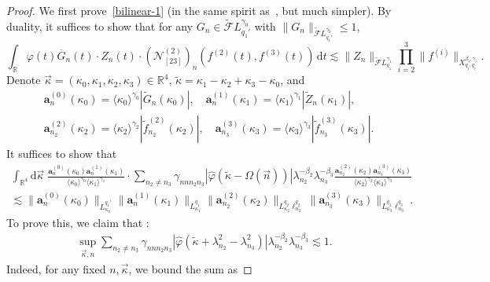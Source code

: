 \documentclass[11pt,reqno,english]{amsart}
\numberwithin{equation}{section}
\theoremstyle{plain}
\theoremstyle{definition}
\theoremstyle{remark}
\newcommand{\ov}{\overline}
\newcommand{\R}{\mathbb{R}}
\newcommand{\la}{\langle}
\newcommand{\ra}{\rangle}
\newcommand{\dd}{\mathrm{d}}
\begin{document}
\begin{proof}
	We first prove~\eqref{bilinear-1} (in the same spirit as~\cite{BCST24}, but much simpler).
	By duality, it suffices to show that for any $G_n\in \widetilde{\mathcal{F}}L_{q_1'}^{\gamma_0}$ with $\|G_n\|_{\widetilde{\mathcal{F}}L^{\gamma_0}_{q_1'}}\leq 1$,
	\begin{equation}\label{pf:bilinear-1}
		\int_{\R} \varphi(t)\ov{G}_n(t)\cdot Z_n(t)\cdot(\mathcal{N}_{[23]}^{(2)})_{n}(f^{(2)}(t),f^{(3)}(t))\, \dd t
		\lesssim
		\|Z_n\|_{\widetilde{\mathcal{F}}L_{q_1}^{\gamma_1}}
		\prod_{i=2}^{3}\|f^{(i)}\|_{X_{q_i,q_i}^{\beta_i,\gamma_i}}.
	\end{equation}
	Denote $\vec{\kappa}=(\kappa_0,\kappa_1,\kappa_2,\kappa_3)\in\R^4$, $\widetilde{\kappa}=\kappa_1-\kappa_2+\kappa_3-\kappa_0$, and
	\begin{align*}
		&\mathbf{a}_n^{(0)}(\kappa_0)=\la\kappa_0\ra^{\gamma_0}|\widetilde{G}_n(\kappa_0)|,\quad \mathbf{a}_n^{(1)}(\kappa_1)=\la\kappa_1\ra^{\gamma_1}|\widetilde{Z}_n(\kappa_1)|,\\
		&\mathbf{a}_{n_2}^{(2)}(\kappa_2)=\la\kappa_2\ra^{\gamma_2}|\widetilde{f}_{n_2}^{(2)}(\kappa_2)|,\quad \mathbf{a}_{n_3}^{(3)}(\kappa_3)=\la\kappa_3\ra^{\gamma_3}|\widetilde{f}_{n_3}^{(3)}(\kappa_3)|.
	\end{align*}
	It suffices to show that
	\begin{multline}
		\label{pf:bilinear-2}
		\int_{\R^4}\dd\vec{\kappa}\;
		\frac{\mathbf{a}_n^{(0)}(\kappa_0)\mathbf{a}_n^{(1)}(\kappa_1)}{\la\kappa_0\ra^{\gamma_0}\la\kappa_1\ra^{\gamma_1}}\cdot
		\sum_{n_2\neq n_3} \gamma_{nnn_2n_3}|\widehat{\varphi}(\widetilde{\kappa}-\Omega(\vec{n}))|\lambda_{n_2}^{-\beta_2}\lambda_{n_3}^{-\beta_3} \frac{\mathbf{a}_{n_2}^{(2)}(\kappa_2)\mathbf{a}_{n_3}^{(3)}(\kappa_3)}{\la\kappa_2\ra^{\gamma_2}\la\kappa_3\ra^{\gamma_3}}
		\\
		\lesssim
		\|\mathbf{a}_n^{(0)}(\kappa_0)\|_{L_{\kappa_0}^{q_1'}}\|\mathbf{a}_n^{(1)}(\kappa_1)\|_{L_{\kappa_1}^{q_1}}\|\mathbf{a}_{n_2}^{(2)}(\kappa_2)\|_{L_{\kappa_2}^{q_2}\ell_{n_2}^{q_2}}
		\|\mathbf{a}_{n_3}^{(3)}(\kappa_3)\|_{L_{\kappa_3}^{q_3}\ell_{n_3}^{q_3}}.
	\end{multline}
To prove this, we claim that :
	\begin{align}\label{claim:sum}
	\sup_{\vec{\kappa},n}\sum_{n_2\neq n_3}\gamma_{nnn_2n_3}|\widehat{\varphi}(\widetilde{\kappa}+\lambda_{n_2}^2-\lambda_{n_3}^2)|\lambda_{n_2}^{-\beta_2}\lambda_{n_3}^{-\beta_3}\lesssim 1.
	\end{align}
Indeed, for any fixed $n,\vec{\kappa}$, we bound the sum as

\end{proof}
\end{document}
